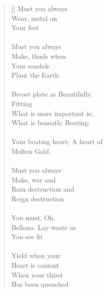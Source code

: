 \documentclass{article}
\begin{document}
\settowidth{\versewidth}{Than Tycho Brahe, or Erra Pater:}
\begin{verse}[\versewidth]
Must you always \\
Wear, metal on \\
Your feet \\
\\
Must you always \\
Make, thuds when \\
Your sandals \\
Plant the Earth \\
\\
Breast plate as Beautifully, \\
Fitting \\
What is more important is; \\
What is beneath; Beating; \\
\\
Your beating heart; A heart of \\
Molten Gold. \\
\\
Must you always \\
Make, war and \\ 
Rain destruction and \\
Reign destruction \\
\\
You must, Oh, \\
Bellona. Lay waste as \\
You see fit \\
\\
Yield when your \\
Heart is content \\
When your thirst \\
Has been quenched \\
\end{verse}
\end{document}
